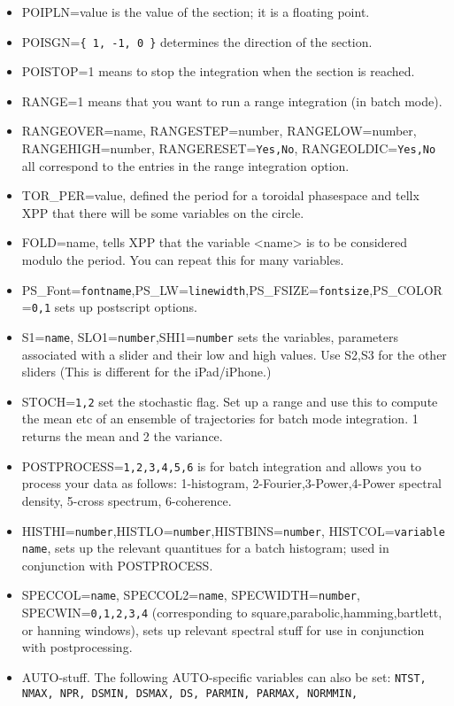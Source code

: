 \begin{itemize}
\item POIPLN=value is the value of the section; it is a floating
point.
\item POISGN={\tt \{ 1, -1, 0 \}} determines the direction of the
section.  
\item POISTOP=1 means to stop the integration when the section is
reached.
\item RANGE=1 means that you want to run a range integration (in batch
mode). 
\item RANGEOVER=name, RANGESTEP=number, RANGELOW=number, RANGEHIGH=number,
  RANGERESET={\tt Yes,No}, RANGEOLDIC={\tt Yes,No} all correspond to 
the entries in the range integration option.
\item TOR\_PER=value, defined the period for a toroidal phasespace and
tellx XPP that there will be some variables on the circle.
\item FOLD=name, tells XPP that the variable <name> is to be
considered modulo the period.  You can repeat this for many variables.
\item PS\_Font={\tt fontname},PS\_LW={\tt linewidth},PS\_FSIZE={\tt fontsize},PS\_COLOR={\tt 0,1} sets up postscript options.
\item S1={\tt name}, SLO1={\tt number},SHI1={\tt number} sets the variables, parameters associated with a slider and their low and high values. Use S2,S3 for the other sliders (This is different for the iPad/iPhone.)
\item STOCH={\tt 1,2} set the stochastic flag. Set up a range and use this to compute the mean etc of an ensemble of trajectories for batch mode integration. 1 returns the mean and 2 the variance.
\item POSTPROCESS={\tt 1,2,3,4,5,6} is for batch integration and allows you to process your data as follows: 1-histogram, 2-Fourier,3-Power,4-Power spectral density, 5-cross spectrum, 6-coherence.
\item HISTHI={\tt number},HISTLO={\tt number},HISTBINS={\tt number}, HISTCOL={\tt variable name}, sets up the relevant quantitues for a batch histogram; used in conjunction with POSTPROCESS.
\item SPECCOL={\tt name}, SPECCOL2={\tt name}, SPECWIDTH={\tt number}, SPECWIN={\tt 0,1,2,3,4} (corresponding to square,parabolic,hamming,bartlett, or hanning windows), sets up relevant spectral stuff for use in conjunction with postprocessing.
\item AUTO-stuff. The following AUTO-specific variables can also be
set: {\tt NTST, NMAX, NPR, DSMIN, DSMAX, DS, PARMIN, PARMAX, NORMMIN,
}
\end{itemize}
